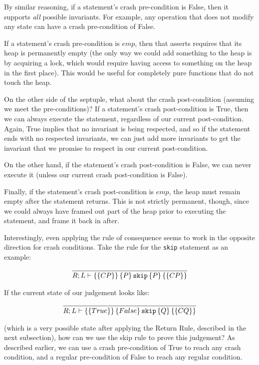By similar reasoning, if a statement's crash pre-condition is False, then it
supports \textit{all} possible invariants. For example, any operation that does
not modify any state can have a crash pre-condition of False.

If a statement's crash pre-condition is $emp$, then that asserts requires that
its heap is permanently empty (the only way we could add something to the heap
is by acquiring a lock, which would require having access to something on the
heap in the first place). This would be useful for completely pure functions
that do not touch the heap.

On the other side of the septuple, what about the crash post-condition (assuming
we meet the pre-conditions)? If a statement's crash post-condition is True, then
we can always execute the statement, regardless of our current post-condition.
Again, True implies that no invariant is being respected, and so if the
statement ends with no respected invariants, we can just add more invariants to
get the invariant that we promise to respect in our current post-condition.

On the other hand, if the statement's crash post-condition is False, we can
never execute it (unless our current crash post-condition is False).

Finally, if the statement's crash post-condition is $emp$, the heap must remain
empty after the statement returns. This is not strictly permanent, though, since we
could always have framed out part of the heap prior to executing the statement,
and frame it back in after.

Interestingly, even applying the rule of consequence seems to work in the
opposite direction for crash conditions. Take the rule for the \texttt{skip}
statement as an example:

\begin{gather*}
    \infer{\hoarestmt{R}{L}{CP}{P}{\texttt{skip}}{P}{CP}}{}
\end{gather*}

If the current state of our judgement looks like:

\begin{gather*}
\infer{\hoarestmt{R}{L}{True}{False}{\texttt{skip}}{Q}{CQ}}{}
\end{gather*}

(which is a very possible state after applying the Return Rule, described in the
next subsection), how can we use the skip rule to prove this judgement? As
described earlier, we can use a crash pre-condition of True to reach any crash
condition, and a regular pre-condition of False to reach any regular condition.

